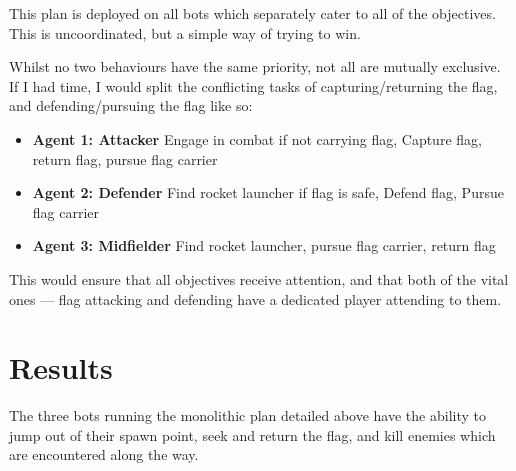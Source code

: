 \documentclass[a4paper,12pt]{article}
\begin{document}
This plan is deployed on all bots which separately cater to all of the objectives. This is uncoordinated, but a simple way of trying to win.


Whilst no two behaviours have the same priority, not all are mutually exclusive. If I had time, I would split the conflicting tasks of capturing/returning the flag, and defending/pursuing the flag like so:
\begin{itemize}
\item \textbf{Agent 1: Attacker} Engage in combat if not carrying flag, Capture flag, return flag, pursue flag carrier
\item \textbf{Agent 2: Defender} Find rocket launcher if flag is safe, Defend flag, Pursue flag carrier
\item \textbf{Agent 3: Midfielder} Find rocket launcher, pursue flag carrier, return flag
\end{itemize}

This would ensure that all objectives receive attention, and that both of the vital ones --- flag attacking and defending have a dedicated player attending to them.
\section{Results}
The three bots running the monolithic plan detailed above have the ability to jump out of their spawn point, seek and return the flag, and kill enemies which are encountered along the way.
\end{document}
